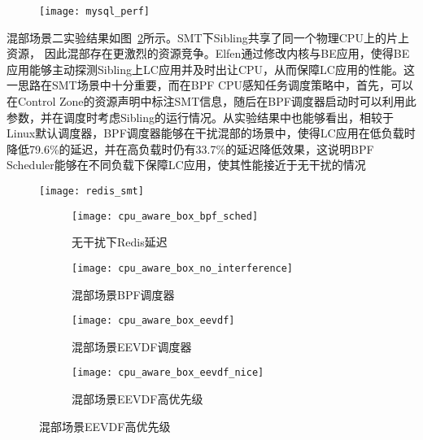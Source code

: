 \begin{figure}[!htbp]
    \centering
    \texttt{[image: mysql\_perf]}
    \label{fig:mysql_perf}
\end{figure}

混部场景二实验结果如图~\ref{fig:redis_smt}所示。SMT下Sibling共享了同一个物理CPU上的片上资源， 因此混部存在更激烈的资源竞争。Elfen\citep{yang2016elfen}通过修改内核与BE应用，使得BE应用能够主动探测Sibling上LC应用并及时出让CPU，从而保障LC应用的性能。这一思路在SMT场景中十分重要，而在BPF CPU感知任务调度策略中，首先，可以在Control Zone的资源声明中标注SMT信息，随后在BPF调度器启动时可以利用此参数，并在调度时考虑Sibling的运行情况。从实验结果中也能够看出，相较于Linux默认调度器，BPF调度器能够在干扰混部的场景中，使得LC应用在低负载时降低79.6\%的延迟，并在高负载时仍有33.7\%的延迟降低效果，这说明BPF Scheduler能够在不同负载下保障LC应用，使其性能接近于无干扰的情况

\begin{figure}[!htbp]
    \centering
    \texttt{[image: redis\_smt]}
    \label{fig:redis_smt}
\end{figure}

\begin{figure}[H]
    \centering
    \begin{subfigure}[b]{0.49\textwidth}
        \texttt{[image: cpu\_aware\_box\_bpf\_sched]}
        \caption{无干扰下Redis延迟}
        \label{fig:cpu_aware_box_bpf_sched}
    \end{subfigure}
    \begin{subfigure}[b]{0.49\textwidth}
        \texttt{[image: cpu\_aware\_box\_no\_interference]}
        \caption{混部场景BPF调度器}
        \label{fig:cpu_aware_box_no_interference}
    \end{subfigure}
    \begin{subfigure}[b]{0.49\textwidth}
        \texttt{[image: cpu\_aware\_box\_eevdf]}
        \caption{混部场景EEVDF调度器}
        \label{fig:cpu_aware_box_eevdf}
    \end{subfigure}
    \begin{subfigure}[b]{0.49\textwidth}
        \texttt{[image: cpu\_aware\_box\_eevdf\_nice]}
        \caption{混部场景EEVDF高优先级}
        \label{fig:cpu_aware_box_eevdf_nice}
    \end{subfigure}
\label{fig:lc_box}
\end{figure}

